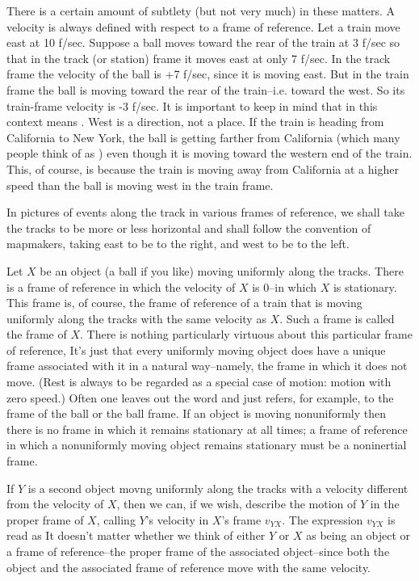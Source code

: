 There is a certain amount of subtlety (but not very much) in these matters. A velocity is always defined with respect to a frame of reference. Let a train move east at 10 f/sec. Suppose a ball moves toward the rear of the train at 3 f/sec so that in the track (or station) frame it moves east at only 7 f/sec. In the track frame the velocity of the ball is +7 f/sec, since it is moving east. But in the train frame the ball is moving toward the rear of the train--i.e. toward   the west. So its train-frame velocity is -3 f/sec. It is important to keep in mind that in this context  means . West is a direction, not a place. If the train is heading from California to New York, the ball is getting farther from California (which many people think of as ) even though it is moving toward the western end of the train. This, of course, is because the train is moving away from California at a higher speed than the ball is moving west in the train frame.

In pictures of events along the track in various frames of reference, we shall take the tracks to be more or less horizontal and shall follow the convention of mapmakers, taking east to be to  the right, and west to be to the left.  

Let $X$ be an object (a ball if you like) moving uniformly along the tracks. There is a frame of reference in which the velocity of $X$ is $0$--in which $X$ is stationary. This frame is, of course, the frame of reference of a train that is moving uniformly along the tracks with the same velocity as $X$. Such a frame is called the  frame of $X$. There is nothing particularly virtuous about this particular frame of reference, It's just that every uniformly moving object does have a unique frame associated with it in a natural way--namely, the frame in which it does not move. (Rest is always to be regarded as a special case of motion: motion with zero speed.) Often one leaves out the word  and just refers, for example, to the frame of the ball or the ball frame. If an object is moving nonuniformly then there is no  frame in which it remains stationary at all times; a frame of reference in which a nonuniformly moving object remains stationary must be a noninertial frame. 

If $Y$ is a second object movng uniformly along the tracks with a velocity different from the velocity of $X$, then we can, if we wish, describe the motion of $Y$ in the proper frame of $X$, calling $Y$'s velocity in $X$'s frame $v_{YX}$. The expression $v_{YX}$ is read as  It doesn't matter whether we think of either $Y$ or $X$ as being an object or a frame of reference--the proper frame of the associated object--since both the object and the associated frame of reference move with the same velocity.

